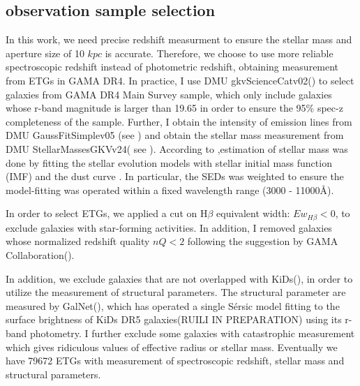 \documentclass[fleqn,usenatbib]{mnras}
\begin{document}
\subsection{observation sample selection}
\par In this work, we need precise redshift measurment to ensure the stellar mass and aperture size of 10 $kpc$ is accurate. Therefore, we choose to use more reliable spectroscopic redshift instead of photometric redshift, obtaining measurement from ETGs in GAMA DR4. 
In practice, I  use DMU gkvScienceCatv02(\cite{bellstedt_galaxy_2020}) to select galaxies from GAMA DR4 Main Survey sample, which only include galaxies whose r-band magnitude is larger than 19.65 in order to ensure the 95\% spec-z completeness of the sample. Further, I obtain the intensity of emission lines from DMU GaussFitSimplev05 (see \cite{Gordon_GAMAspecline_2017}) and obtain the stellar mass measurement from DMU StellarMassesGKVv24( see \cite{GAMAmain}). According to \cite{Taylor2011},estimation of stellar mass was done by fitting the \cite{bruzual_2003} stellar evolution models with \cite{chabrier2003} stellar initial mass function (IMF) and the \cite{calzetti2000} dust curve . In particular, the SEDs was weighted to ensure the model-fitting was operated within a fixed wavelength range (3000 - 11000\r{A}). 
\par In order to select ETGs, we applied a cut on H$\beta$ equivalent width: $Ew_{H\beta} < 0 $, to exclude galaxies with star-forming activities. In addition, I removed galaxies whose normalized redshift quality $nQ < 2$ following the suggestion by GAMA Collaboration(\citep{GAMAmain}).
\par In addition, we exclude galaxies that are not overlapped with KiDs(\cite{kuijken_fourth_2019}), in order to utilize the measurement of structural parameters. 
The structural parameter are measured by GalNet(\cite{GaLNet2022}), which has operated a single S\'{e}rsic model fitting to the surface brightness of  KiDs DR5 galaxies(RUILI IN PREPARATION) using its r-band photometry.
 I further exclude some galaxies with catastrophic measurement which gives ridiculous values of effective radius or stellar mass. Eventually we have 79672 ETGs with measurement of spectroscopic redshift, stellar mass and structural parameters.  
\end{document}

